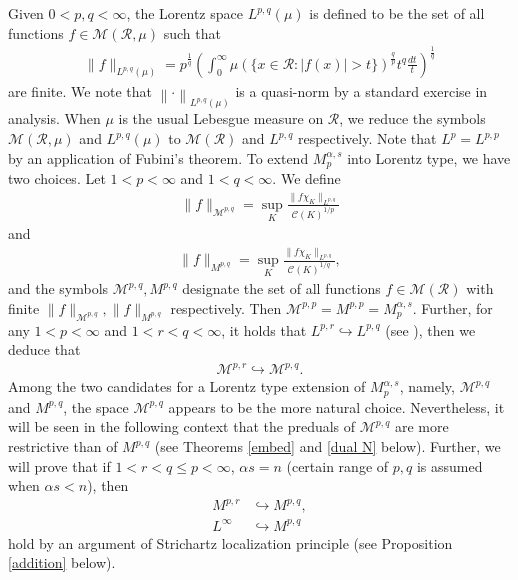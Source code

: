 \documentclass[10pt,reqno]{amsart}
\numberwithin{equation}{section}
\begin{document}
Given $0<p,q<\infty$, the Lorentz space $L^{p,q}(\mu)$ is defined to be the set of all functions $f\in\mathcal{M}(\mathcal{R},\mu)$ such that
\begin{align*}
\|f\|_{L^{p,q}(\mu)}=p^{\frac{1}{q}}\left(\int_{0}^{\infty}\mu(\{x\in\mathcal{R}:|f(x)|>t\})^{\frac{q}{p}}t^{q}\frac{dt}{t}\right)^{\frac{1}{q}}
\end{align*}
are finite. We note that $\left\|\cdot\right\|_{L^{p,q}(\mu)}$ is a quasi-norm by a standard exercise in analysis. When $\mu$ is the usual Lebesgue measure on $\mathcal{R}$, we reduce the symbols $\mathcal{M}(\mathcal{R},\mu)$ and $L^{p,q}(\mu)$ to $\mathcal{M}(\mathcal{R})$ and $L^{p,q}$ respectively. Note that $L^{p}=L^{p,p}$ by an application of Fubini's theorem. To extend $M_{p}^{\alpha,s}$ into Lorentz type, we have two choices. Let $1<p<\infty$ and $1<q<\infty$. We define
\begin{align*}
\|f\|_{\mathcal{M}^{p,q}}=\sup_{K}\frac{\|f\chi_{K}\|_{L^{p,q}}}{\mathcal{C}(K)^{1/p}}
\end{align*}
and
\begin{align*}
\|f\|_{M^{p,q}}=\sup_{K}\frac{\|f\chi_{K}\|_{L^{p,q}}}{\mathcal{C}(K)^{1/q}},
\end{align*}
and the symbols $\mathcal{M}^{p,q},M^{p,q}$ designate the set of all functions $f\in\mathcal{M}(\mathcal{R})$ with finite $\|f\|_{\mathcal{M}^{p,q}},\|f\|_{M^{p,q}}$ respectively. Then $\mathcal{M}^{p,p}=M^{p,p}=M_{p}^{\alpha,s}$. Further, for any $1<p<\infty$ and $1<r<q<\infty$, it holds that $L^{p,r}\hookrightarrow L^{p,q}$ (see \cite[Proposition 1.4.10]{GL}), then we deduce that 
\begin{align*}
\mathcal{M}^{p,r}\hookrightarrow\mathcal{M}^{p,q}.
\end{align*}
Among the two candidates for a Lorentz type extension of $M_{p}^{\alpha,s}$, namely, $\mathcal{M}^{p,q}$ and $M^{p,q}$, the space $\mathcal{M}^{p,q}$ appears to be the more natural choice. Nevertheless, it will be seen in the following context that the preduals of $\mathcal{M}^{p,q}$ are more restrictive than of $M^{p,q}$ (see Theorems \ref{embed} and \ref{dual N} below). Further, we will prove that if $1<r<q\leq p<\infty$, $\alpha s=n$ (certain range of $p,q$ is assumed when $\alpha s<n$), then
\begin{align*}
M^{p,r}&\hookrightarrow M^{p,q},\\
L^{\infty}&\hookrightarrow M^{p,q}
\end{align*}
hold by an argument of Strichartz localization principle (see Proposition \ref{addition} below). 
\end{document}
